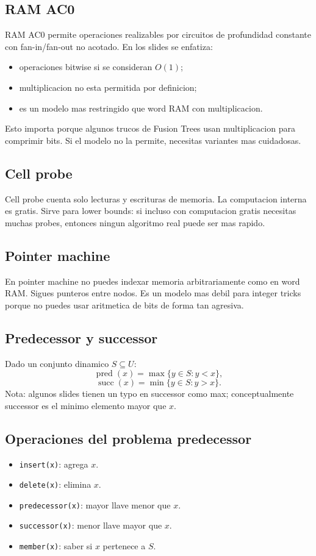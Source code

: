 \documentclass[10pt]{article}
\newcommand{\bigO}{O}
\newcommand{\pred}{\operatorname{pred}}
\newcommand{\succop}{\operatorname{succ}}
\begin{document}
\subsection{RAM AC0}
RAM AC0 permite operaciones realizables por circuitos de profundidad constante
con fan-in/fan-out no acotado. En los slides se enfatiza:
\begin{itemize}[leftmargin=*]
\item operaciones bitwise si se consideran $\bigO(1)$;
\item multiplicacion no esta permitida por definicion;
\item es un modelo mas restringido que word RAM con multiplicacion.
\end{itemize}
Esto importa porque algunos trucos de Fusion Trees usan multiplicacion para
comprimir bits. Si el modelo no la permite, necesitas variantes mas cuidadosas.

\subsection{Cell probe}
Cell probe cuenta solo lecturas y escrituras de memoria. La computacion interna
es gratis. Sirve para lower bounds: si incluso con computacion gratis necesitas
muchas probes, entonces ningun algoritmo real puede ser mas rapido.

\subsection{Pointer machine}
En pointer machine no puedes indexar memoria arbitrariamente como en word RAM.
Sigues punteros entre nodos. Es un modelo mas debil para integer tricks porque
no puedes usar aritmetica de bits de forma tan agresiva.

\subsection{Predecessor y successor}
Dado un conjunto dinamico $S\subseteq U$:
\[
\pred(x)=\max\{y\in S:y<x\},
\]
\[
\succop(x)=\min\{y\in S:y>x\}.
\]
Nota: algunos slides tienen un typo en successor como max; conceptualmente
successor es el minimo elemento mayor que $x$.

\subsection{Operaciones del problema predecessor}
\begin{itemize}[leftmargin=*]
\item \texttt{insert(x)}: agrega $x$.
\item \texttt{delete(x)}: elimina $x$.
\item \texttt{predecessor(x)}: mayor llave menor que $x$.
\item \texttt{successor(x)}: menor llave mayor que $x$.
\item \texttt{member(x)}: saber si $x$ pertenece a $S$.
\end{itemize}
\end{document}
